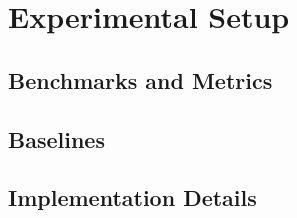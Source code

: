 \section{Experimental Setup}
\label{sec:setup}

\subsection{Benchmarks and Metrics}
\label{sec:setup-benchmarks}

\subsection{Baselines}
\label{sec:setup-baselines}

\subsection{Implementation Details}
\label{sec:setup-implementation}


